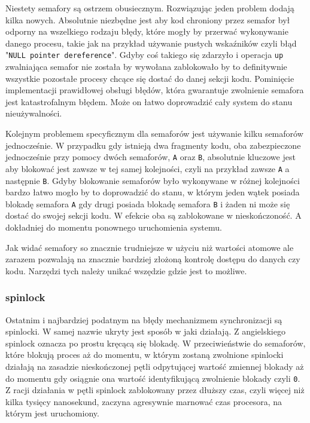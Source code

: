 \documentclass[10pt]{article}
\begin{document}
Niestety semafory są ostrzem obusiecznym. Rozwiązując jeden problem dodają kilka nowych. Absolutnie niezbędne jest aby kod chroniony przez semafor był odporny na wszelkiego rodzaju błędy, które mogły by przerwać wykonywanie danego procesu, takie jak na przykład używanie pustych wskaźników czyli błąd "\texttt{NULL pointer dereference}". Gdyby coś takiego się zdarzyło i operacja \texttt{up} zwalniająca semafor nie została by wywołana zablokowało by to definitywnie wszystkie pozostałe procesy chcące się dostać do danej sekcji kodu. Pominięcie implementacji prawidłowej obsługi błędów, która gwarantuje zwolnienie semafora jest katastrofalnym błędem. Może on łatwo doprowadzić cały system do stanu nieużywalności.

Kolejnym problemem specyficznym dla semaforów jest używanie kilku semaforów jednocześnie. W przypadku gdy istnieją dwa fragmenty kodu, oba zabezpieczone jednocześnie przy pomocy dwóch semaforów, \texttt{A} oraz \texttt{B}, absolutnie kluczowe jest aby blokować jest zawsze w tej samej kolejności, czyli na przykład zawsze \texttt{A} a następnie \texttt{B}. Gdyby blokowanie semaforów było wykonywane w różnej kolejności bardzo łatwo mogło by to doprowadzić do stanu, w którym jeden wątek posiada blokadę semafora \texttt{A} gdy drugi posiada blokadę semafora \texttt{B} i żaden ni może się dostać do swojej sekcji kodu. W efekcie oba są zablokowane w nieskończoność. A dokładniej do momentu ponownego uruchomienia systemu.

Jak widać semafory so znacznie trudniejsze w użyciu niż wartości atomowe ale zarazem pozwalają na znacznie bardziej złożoną kontrolę dostępu do danych czy kodu. Narzędzi tych należy unikać wszędzie gdzie jest to możliwe.

\subsubsection{spinlock}

Ostatnim i najbardziej podatnym na błędy mechanizmem synchronizacji są spinlocki. W samej nazwie ukryty jest sposób w jaki działają. Z angielskiego spinlock oznacza po prostu kręcącą się blokadę. W przeciwieństwie do semaforów, które blokują proces aż do momentu, w którym zostaną zwolnione spinlocki działają na zasadzie nieskończonej pętli odpytującej wartość zmiennej blokady aż do momentu gdy osiągnie ona wartość identyfikującą zwolnienie blokady czyli \texttt{0}. Z racji działania w pętli spinlock zablokowany przez dłuższy czas, czyli więcej niż kilka tysięcy nanosekund, zaczyna agresywnie marnować czas procesora, na którym jest uruchomiony.
\end{document}
